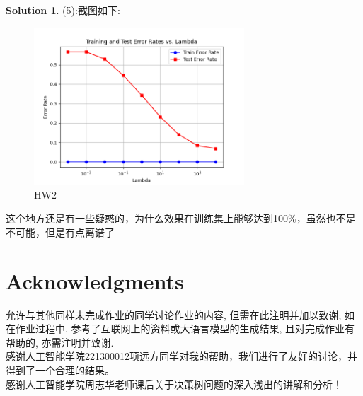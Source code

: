 \documentclass[a4paper]{article}
\numberwithin{equation}{section}
\theoremstyle{definition}
\newtheorem*{solution}{Solution}
\begin{document}
\begin{solution}
    (5):截图如下:\\
    \begin{figure}[H]
		\centering
		\includegraphics[width=0.7\textwidth]{HW2.png}
		\caption{HW2}
		\label{HW2}
	\end{figure}
    这个地方还是有一些疑惑的，为什么效果在训练集上能够达到100\%，虽然也不是不可能，但是有点离谱了

\end{solution}
\newpage

\section*{Acknowledgments}
允许与其他同样未完成作业的同学讨论作业的内容, 但需在此注明并加以致谢; 如在作业过程中, 参考了互联网上的资料或大语言模型的生成结果, 且对完成作业有帮助的, 亦需注明并致谢.\\

感谢人工智能学院221300012项远方同学对我的帮助，我们进行了友好的讨论，并得到了一个合理的结果。\\

感谢人工智能学院周志华老师课后关于决策树问题的深入浅出的讲解和分析！\\
\end{document}
